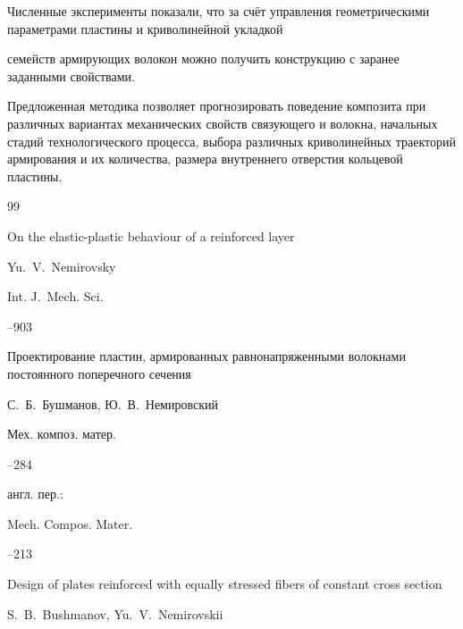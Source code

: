 Численные эксперименты показали, что за счёт управления геометрическими параметрами пластины и криволинейной укладкой

семейств армирующих волокон можно получить конструкцию с заранее заданными свойствами. 

Предложенная методика позволяет прогнозировать поведение композита при различных вариантах механических свойств связующего и волокна, начальных стадий технологического процесса, выбора различных криволинейных траекторий армирования и их количества, размера внутреннего отверстия кольцевой пластины.







\begin{thebibliography}{99}




\paper On the elastic-plastic behaviour of a reinforced layer

\by Yu.~V.~Nemirovsky     

\jour Int. J.~Mech. Sci.




--903







\paper Проектирование пластин, армированных равнонапряженными волокнами постоянного поперечного сечения

\by    С.~Б.~Бушманов, Ю.~В.~Немировский

\jour Мех. композ. матер.



--284

\transl англ. пер.:~

\jour Mech. Compos. Mater.




--213

\paper Design of plates reinforced with equally stressed fibers of constant cross section

\by S.~B.~Bushmanov, Yu.~V.~Nemirovskii 


\end{thebibliography}
